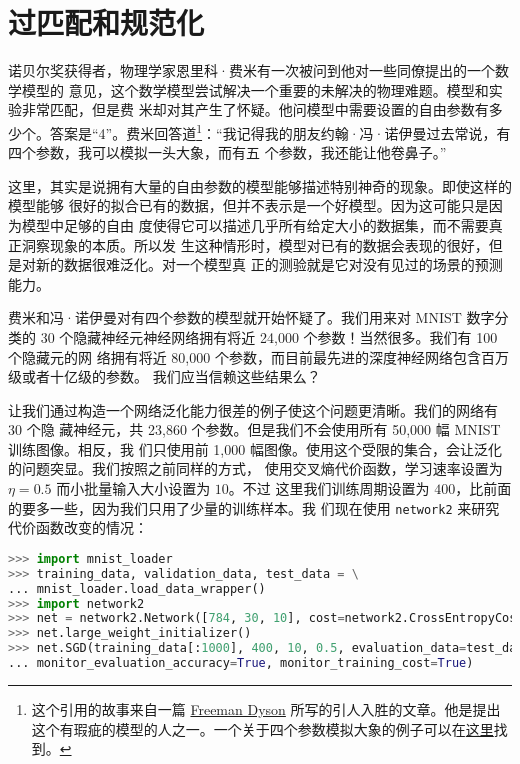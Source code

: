 \section{过匹配和规范化}
\label{sec:overfitting_and_regularization}

诺贝尔奖获得者，物理学家恩里科·费米有一次被问到他对一些同僚提出的一个数学模型的
意见，这个数学模型尝试解决一个重要的未解决的物理难题。模型和实验非常匹配，但是费
米却对其产生了怀疑。他问模型中需要设置的自由参数有多少个。答案是``4''。费米回答道\footnote{
这个引用的故事来自一篇 \href{http://www.nature.com/nature/journal/v427/n6972/full/427297a.html}{Freeman
    Dyson} 所写的引人入胜的文章。他是提出这个有瑕疵的模型的人之一。一个关于四个参数模拟大象的例子可以在\href{http://www.johndcook.com/blog/2011/06/21/how-to-fit-an-elephant/}{这里}找到。}：``我记得我的朋友约翰·冯·诺伊曼过去常说，有四个参数，我可以模拟一头大象，而有五
个参数，我还能让他卷鼻子。''

这里，其实是说拥有大量的自由参数的模型能够描述特别神奇的现象。即使这样的模型能够
很好的拟合已有的数据，但并不表示是一个好模型。因为这可能只是因为模型中足够的自由
度使得它可以描述几乎所有给定大小的数据集，而不需要真正洞察现象的本质。所以发
生这种情形时，模型对已有的数据会表现的很好，但是对新的数据很难泛化。对一个模型真
正的测验就是它对没有见过的场景的预测能力。

费米和冯·诺伊曼对有四个参数的模型就开始怀疑了。我们用来对 MNIST 数字分类的 30
个隐藏神经元神经网络拥有将近 24,000 个参数！当然很多。我们有 100 个隐藏元的网
络拥有将近 80,000 个参数，而目前最先进的深度神经网络包含百万级或者十亿级的参数。
我们应当信赖这些结果么？

让我们通过构造一个网络泛化能力很差的例子使这个问题更清晰。我们的网络有 30 个隐
藏神经元，共 23,860 个参数。但是我们不会使用所有 50,000 幅 MNIST 训练图像。相反，我
们只使用前 1,000 幅图像。使用这个受限的集合，会让泛化的问题突显。我们按照之前同样的方式，
使用交叉熵代价函数，学习速率设置为 $\eta = 0.5$ 而小批量输入大小设置为 $10$。不过
这里我们训练周期设置为 $400$，比前面的要多一些，因为我们只用了少量的训练样本。我
们现在使用 \lstinline!network2! 来研究代价函数改变的情况：

\begin{lstlisting}[language=Python]
>>> import mnist_loader
>>> training_data, validation_data, test_data = \
... mnist_loader.load_data_wrapper()
>>> import network2
>>> net = network2.Network([784, 30, 10], cost=network2.CrossEntropyCost)
>>> net.large_weight_initializer()
>>> net.SGD(training_data[:1000], 400, 10, 0.5, evaluation_data=test_data,
... monitor_evaluation_accuracy=True, monitor_training_cost=True)
\end{lstlisting}

